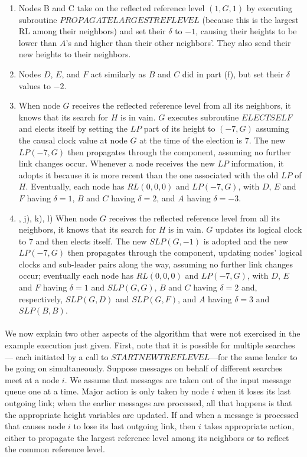 \begin{enumerate}[label=\alph*)]
	\item Nodes B and C take on the reflected reference level $(1,G,1)$ by executing subroutine $PROPAGATELARGESTREFLEVEL$ (because this is the largest RL among their neighbors) and set their $\delta$ to $-1$, causing their heights to be lower than $A$’s and higher than their other neighbors’. They also send their new heights to their neighbors.
	\item Nodes $D$, $E$, and $F$ act similarly as $B$ and $C$ did in part (f), but set their $\delta$ values to $-2$.
	\item When node $G$ receives the reflected reference level from all its neighbors, it knows that its search for $H$ is in vain. $G$ executes subroutine $ELECTSELF$ and elects itself by setting the $LP$ part of its height to $(-7,G)$ assuming the causal clock value at node $G$ at the time of the election is $7$. The new $LP(-7,G)$ then propagates through the component, assuming no further link changes occur. Whenever a node receives the new $LP$ information, it adopts it because it is more recent than the one associated with the old $LP$ of $H$. Eventually, each node has $RL (0,0,0)$ and $LP (-7,G)$, with $D$, $E$ and $F$ having $\delta = 1$, $B$ and $C$ having $\delta = 2$, and $A$ having $\delta = -3$.
	\item , j), k), l) When node $G$ receives the reflected reference level from all its neighbors, it knows that its search for $H$ is in vain. $G$ updates its logical clock to $7$ and then elects itself. The new $SLP(G,-1)$ is adopted and the new $LP(-7,G)$ then propagates through the component, updating nodes’ logical clocks and sub-leader pairs along the way, assuming no further link changes occur; eventually each node has $RL(0,0,0)$ and $LP(-7,G)$, with $D$, $E$ and $F$ having $\delta = 1$ and $SLP(G,G)$, $B$ and $C$ having $\delta = 2$ and, respectively, $SLP(G,D)$ and $SLP(G,F)$, and $A$ having $\delta = 3$ and $SLP(B,B)$.
\end{enumerate}
\paragraph{}We now explain two other aspects of the algorithm that were not exercised in the example execution just given. First, note that it is possible for multiple searches— each initiated by a call to $STARTNEWTREFLEVEL$—for the same leader to be going on simultaneously. Suppose messages on behalf of different searches meet at a node $i$. We assume that messages are taken out of the input message queue one at a time. Major action is only taken by node $i$ when it loses its last outgoing link; when the earlier messages are processed, all that happens is that the appropriate height variables are updated. If and when a message is processed that causes node $i$ to lose its last outgoing link, then $i$ takes appropriate action, either to propagate the largest reference level among its neighbors or to reflect the common reference level.
